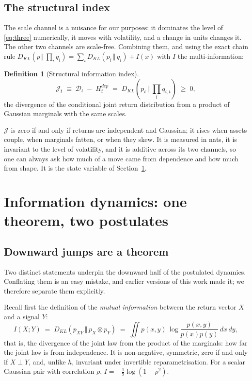 \documentclass[11pt]{article}
\theoremstyle{definition}
\newtheorem{definition}{Definition}
\theoremstyle{remark}
\newcommand{\JJ}{\mathcal{J}}
\newcommand{\DD}{\mathcal{D}}
\newcommand{\KL}[2]{D_{KL}\!\left(#1\,\Vert\,#2\right)}
\begin{document}
\subsection{The structural index}

The scale channel is a nuisance for our purposes: it dominates the level of
\eqref{eq:three} numerically, it moves with volatility, and a change in units
changes it. The other two channels are scale-free. Combining them, and using the
exact chain rule
$\KL{p}{\prod_i q_i} = \sum_i \KL{p_i}{q_i} + I(x)$ with $I$ the
multi-information:

\begin{definition}[Structural information index]
\label{def:J}
\begin{equation}
\JJ_t \;\equiv\; \DD_t \;-\; H^{dep}_t \;=\; \KL{p_t}{\textstyle\prod_i q_{i,t}} \;\ge\; 0 ,
\end{equation}
the divergence of the conditional joint return distribution from a product of
Gaussian marginals with the same scales.
\end{definition}

$\JJ$ is zero if and only if returns are independent and Gaussian; it rises when
assets couple, when marginals fatten, or when they skew. It is measured in nats,
it is invariant to the level of volatility, and it is additive across its two
channels, so one can always ask how much of a move came from dependence and how
much from shape. It is the state variable of Section~\ref{sec:dynamics}.


\section{Information dynamics: one theorem, two postulates}
\label{sec:dynamics}

\subsection{Downward jumps are a theorem}

Two distinct statements underpin the downward half of the postulated dynamics.
Conflating them is an easy mistake, and earlier versions of this work made it;
we therefore separate them explicitly.

Recall first the definition of the \emph{mutual information} between the return
vector $X$ and a signal $Y$:
\begin{equation}
\label{eq:mi}
I(X;Y) \;=\; \KL{p_{XY}}{p_X\otimes p_Y}
\;=\; \iint p(x,y)\,\log\frac{p(x,y)}{p(x)p(y)}\,dx\,dy ,
\end{equation}
that is, the divergence of the joint law from the product of the marginals: how
far the joint law is from independence. It is non-negative, symmetric, zero if
and only if $X\perp Y$, and, unlike $h$, invariant under invertible
reparametrisation. For a scalar Gaussian pair with correlation $\rho$,
$I=-\tfrac12\log(1-\rho^2)$.
\end{document}

